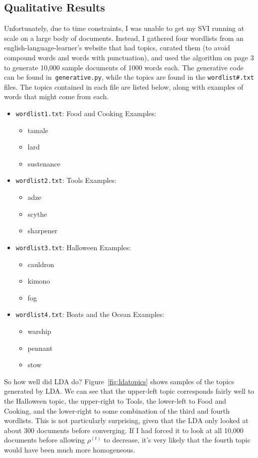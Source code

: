 \documentclass{article}
\begin{document}
\subsection{Qualitative Results}

Unfortunately, due to time constraints, I was unable to get my SVI running at
scale on a large body of documents. Instead, I gathered four wordlists from an
english-language-learner's website that had topics, curated them (to avoid
compound words and words with punctuation), and used the algorithm on page 3 to
generate 10,000 sample documents of 1000 words each. The generative code can be
found in\texttt{ generative.py}, while the topics are found in the
\texttt{wordlist\#.txt} files. The topics contained in each file are listed
below, along with examples of words that might come from each.

\begin{itemize}
\item \texttt{wordlist1.txt}: Food and Cooking
  Examples:
  \begin{itemize}
  \item tamale
  \item lard
  \item sustenance
  \end{itemize}
\item \texttt{wordlist2.txt}: Tools
  Examples:
  \begin{itemize}
  \item adze
  \item scythe
  \item sharpener
  \end{itemize}
\item \texttt{wordlist3.txt}: Halloween
  Examples:
  \begin{itemize}
  \item cauldron
  \item kimono
  \item fog
  \end{itemize}
\item \texttt{wordlist4.txt}: Boats and the Ocean
  Examples:
  \begin{itemize}
  \item warship
  \item pennant
  \item stow
  \end{itemize}
\end{itemize}

So how well did LDA do? Figure~\ref{fig:ldatopics} shows samples of the topics generated
by LDA. We can see that the upper-left topic corresponds fairly well to the
Halloween topic, the upper-right to Tools, the lower-left to Food and Cooking,
and the lower-right to some combination of the third and fourth wordlists. This
is not particularly surprising, given that the LDA only looked at about 300
documents before converging. If I had forced it to look at all 10,000 documents
before allowing $\rho^{(t)}$ to decrease, it's very likely that the fourth topic
would have been much more homogeneous.
\end{document}
